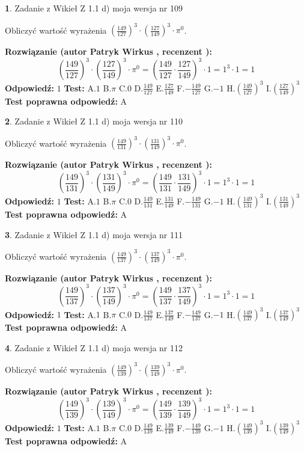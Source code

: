 \documentclass[12pt, a4paper]{article}
\theoremstyle{definition} %
\newtheorem{zad}{}
\newcommand{\zadStart}[1]{\begin{zad}#1\newline}
\newcommand{\zadStop}{\end{zad}}
\newcommand{\rozwStart}[2]{\noindent \textbf{Rozwiązanie (autor #1 , recenzent #2): }\newline}
\newcommand{\rozwStop}{\newline}
\newcommand{\odpStart}{\noindent \textbf{Odpowiedź:}\newline}
\newcommand{\odpStop}{\newline}
\newcommand{\testStart}{\noindent \textbf{Test:}\newline}
\newcommand{\testStop}{\newline}
\newcommand{\kluczStart}{\noindent \textbf{Test poprawna odpowiedź:}\newline}
\newcommand{\kluczStop}{\newline}
\begin{document}
\zadStart{Zadanie z Wikieł Z 1.1 d) moja wersja nr 109}

Obliczyć wartość wyrażenia $(\frac{149}{127})^{3} \cdot (\frac{127}{149})^{3} \cdot \pi^{0}$.
\zadStop
\rozwStart{Patryk Wirkus}{}
$$(\frac{149}{127})^{3} \cdot (\frac{127}{149})^{3} \cdot \pi^{0} = (\frac{149}{127} \cdot \frac{127}{149})^{3} \cdot 1 = 1^{3} \cdot 1 = 1$$
\rozwStop
\odpStart
$1$
\odpStop
\testStart
A.$1$ B.$\pi$ C.$0$ D.$\frac{149}{127}$ E.$\frac{127}{149}$
F.$-\frac{149}{127}$ G.$-1$
H.$(\frac{149}{127})^{3}$
I.$(\frac{127}{149})^{3}$
\testStop
\kluczStart
A
\kluczStop



\zadStart{Zadanie z Wikieł Z 1.1 d) moja wersja nr 110}

Obliczyć wartość wyrażenia $(\frac{149}{131})^{3} \cdot (\frac{131}{149})^{3} \cdot \pi^{0}$.
\zadStop
\rozwStart{Patryk Wirkus}{}
$$(\frac{149}{131})^{3} \cdot (\frac{131}{149})^{3} \cdot \pi^{0} = (\frac{149}{131} \cdot \frac{131}{149})^{3} \cdot 1 = 1^{3} \cdot 1 = 1$$
\rozwStop
\odpStart
$1$
\odpStop
\testStart
A.$1$ B.$\pi$ C.$0$ D.$\frac{149}{131}$ E.$\frac{131}{149}$
F.$-\frac{149}{131}$ G.$-1$
H.$(\frac{149}{131})^{3}$
I.$(\frac{131}{149})^{3}$
\testStop
\kluczStart
A
\kluczStop



\zadStart{Zadanie z Wikieł Z 1.1 d) moja wersja nr 111}

Obliczyć wartość wyrażenia $(\frac{149}{137})^{3} \cdot (\frac{137}{149})^{3} \cdot \pi^{0}$.
\zadStop
\rozwStart{Patryk Wirkus}{}
$$(\frac{149}{137})^{3} \cdot (\frac{137}{149})^{3} \cdot \pi^{0} = (\frac{149}{137} \cdot \frac{137}{149})^{3} \cdot 1 = 1^{3} \cdot 1 = 1$$
\rozwStop
\odpStart
$1$
\odpStop
\testStart
A.$1$ B.$\pi$ C.$0$ D.$\frac{149}{137}$ E.$\frac{137}{149}$
F.$-\frac{149}{137}$ G.$-1$
H.$(\frac{149}{137})^{3}$
I.$(\frac{137}{149})^{3}$
\testStop
\kluczStart
A
\kluczStop



\zadStart{Zadanie z Wikieł Z 1.1 d) moja wersja nr 112}

Obliczyć wartość wyrażenia $(\frac{149}{139})^{3} \cdot (\frac{139}{149})^{3} \cdot \pi^{0}$.
\zadStop
\rozwStart{Patryk Wirkus}{}
$$(\frac{149}{139})^{3} \cdot (\frac{139}{149})^{3} \cdot \pi^{0} = (\frac{149}{139} \cdot \frac{139}{149})^{3} \cdot 1 = 1^{3} \cdot 1 = 1$$
\rozwStop
\odpStart
$1$
\odpStop
\testStart
A.$1$ B.$\pi$ C.$0$ D.$\frac{149}{139}$ E.$\frac{139}{149}$
F.$-\frac{149}{139}$ G.$-1$
H.$(\frac{149}{139})^{3}$
I.$(\frac{139}{149})^{3}$
\testStop
\kluczStart
A
\kluczStop
\end{document}
